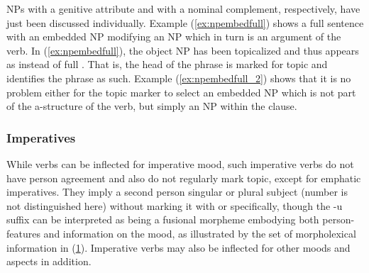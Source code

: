 NPs with a genitive attribute and with a nominal complement, respectively, have
just been discussed individually. Example (\ref{ex:npembedfull}) shows a full
sentence with an embedded NP modifying an NP which in turn is an argument of
the verb. In (\ref{ex:npembedfull}), the object NP has been topicalized and
thus appears as  instead of full .
That is, the head of the phrase is marked for topic and identifies the phrase
as such. Example (\ref{ex:npembedfull_2}) shows that it is no problem either
for the topic marker to select an embedded NP which is not part of the
a-structure of the verb, but simply an NP within the clause.


\subsubsection{Imperatives}

While verbs can be inflected for imperative mood, such imperative verbs do not
have person agreement and also do not regularly mark topic, except for emphatic
imperatives. They imply a second person singular or plural subject (number is
not distinguished here) without marking it with  or
 specifically, though the  {-u} suffix can be
interpreted as being a fusional morpheme embodying both person-features and
information on the mood, as illustrated by the set of morpholexical information
in (\ref{ex:impfeat}). Imperative verbs may also be inflected for other moods
and aspects in addition.

\begin{figure}
\begin{morphlex}
\ex\label{ex:impfeat}%
\xe
\end{morphlex}
\end{figure}

